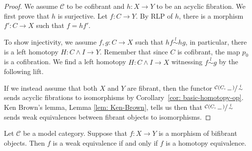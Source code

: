 \documentclass[../thesis.tex]{subfiles}
\begin{document}
            \begin{proof}
                We assume $\mathcal{C}$ to be cofibrant and $h: X\rightarrow Y$ to be an acyclic fibration. We first prove that $h$ is surjective. Let $f:C\rightarrow Y$. By RLP of $h$, there is a morphism $f':C\rightarrow X$ such that $f = hf'$.
                \begin{center}
                \end{center}
                
                To show injectivity, we assume $f,g: C\rightarrow X$ such that $hf\overset{l}{\sim} hg$, in particular, there is a left homotopy $H: C\wedge I \rightarrow Y$. Remember that since $C$ is cofibrant, the map $p_0$ is a cofibration. We find a left homotopy $H: C\wedge I \rightarrow X$ witnessing $f\overset{l}{\sim} g$ by the following lift.
                \begin{center}
                \end{center}

                If we instead assume that both $X$ and $Y$ are fibrant, then the functor $\sfrac{\mathcal{C}(C,\hspace{0.05cm}\underline{\hspace{0.2cm}}\hspace{0.05cm})}{\overset{l}{\sim}}$ sends acyclic fibrations to isomorphisms by Corollary~\ref{cor: basic-homotopy-op}. Ken Brown's lemma, Lemma \ref{lem: Ken-Brown}, tells us then that $\sfrac{\mathcal{C}(C,\hspace{0.05cm}\underline{\hspace{0.2cm}}\hspace{0.05cm})}{\overset{l}{\sim}}$ sends weak equivalences between fibrant objects to isomorphisms.
            \end{proof}

            \begin{thm}\label{thm: Whitehead}
                Let $\mathcal{C}$ be a model category. Suppose that $f: X \rightarrow Y$ is a morphism of bifibrant objects. Then $f$ is a weak equivalence if and only if $f$ is a homotopy equivalence.
            \end{thm}
\end{document}
